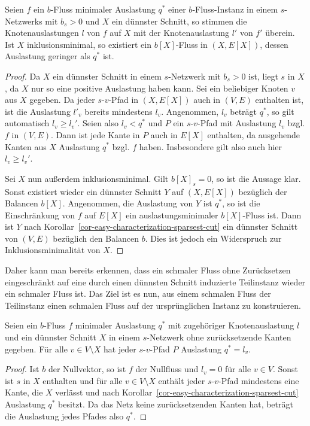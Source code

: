\begin{proposition}\label{prop-restricted-minimal-flow-is-b-flow-on-induced-instance}
	Seien $f$ ein $b$-Fluss minimaler Auslastung $q^*$ einer $b$-Fluss-Instanz in einem $s$-Netzwerks mit $b_s > 0$ und $X$ ein dünnster Schnitt, so stimmen die Knotenauslastungen $l$ von $f$ auf $X$ mit der Knotenauslastung $l'$ von $f'$ überein.
	Ist $X$ inklusionsminimal, so existiert ein $b[X]$-Fluss in $(X, E[X])$, dessen Auslastung geringer als $q^*$ ist.
\end{proposition}
\begin{proof}
	Da $X$ ein dünnster Schnitt in einem $s$-Netzwerk mit $b_s > 0$ ist, liegt $s$ in $X$, da $X$ nur so eine positive Auslastung haben kann.
	Sei ein beliebiger Knoten $v$ aus $X$ gegeben.
	Da jeder $s$-$v$-Pfad in $(X, E[X])$ auch in $(V, E)$ enthalten ist, ist die Auslastung $l'_v$ bereits mindestens $l_v$.
	Angenommen, $l_v$ beträgt $q^*$, so gilt automatisch $l_v \geq l_v'$.
	Seien also $l_v < q^*$ und $P$ ein $s$-$v$-Pfad mit Auslastung $l_v$ bzgl. $f$ in $(V, E)$.
	Dann ist jede Kante in $P$ auch in $E[X]$ enthalten, da ausgehende Kanten aus $X$ Auslastung $q^*$ bzgl. $f$ haben.
	Insbesondere gilt also auch hier $l_v \geq l_v'$.
	
	Sei $X$ nun außerdem inklusionsminimal.
	Gilt $b[X]_s = 0$, so ist die Aussage klar.
	Sonst existiert wieder ein dünnster Schnitt $Y$ auf $(X, E[X])$ bezüglich der Balancen $b[X]$.
	Angenommen, die Auslastung von $Y$ ist $q^*$, so ist die Einschränkung von $f$ auf $E[X]$ ein auslastungsminimaler $b[X]$-Fluss ist.
	Dann ist $Y$ nach Korollar~\ref{cor-easy-characterization-sparsest-cut} ein dünnster Schnitt von $(V, E)$ bezüglich den Balancen $b$.
	Dies ist jedoch ein Widerspruch zur Inklusionsminimalität von $X$.
\end{proof}

Daher kann man bereits erkennen, dass ein schmaler Fluss ohne Zurücksetzen eingeschränkt auf eine durch einen dünnsten Schnitt induzierte Teilinstanz wieder ein schmaler Fluss ist.
Das Ziel ist es nun, aus einem schmalen Fluss der Teilinstanz einen schmalen Fluss auf der ursprünglichen Instanz zu konstruieren.

\begin{lemma}\label{lemma-flow-minimal-congestion-sparsest-cut-then-outside-X-congestion-q}
	Seien ein $b$-Fluss $f$ minimaler Auslastung $q^*$ mit zugehöriger Knotenauslastung $l$ und ein dünnster Schnitt $X$ in einem $s$-Netzwerk ohne zurücksetzende Kanten gegeben.
	Für alle $v\in V\setminus X$ hat jeder $s$-$v$-Pfad $P$ Auslastung $q^*=l_v$.
\end{lemma}
\begin{proof}
	Ist $b$ der Nullvektor, so ist $f$ der Nullfluss und $l_v = 0$ für alle $v\in V$.
	Sonst ist $s$ in $X$ enthalten und für alle $v\in V\setminus X$ enthält jeder $s$-$v$-Pfad mindestens eine Kante, die $X$ verlässt und nach Korollar~\ref{cor-easy-characterization-sparsest-cut} Auslastung $q^*$ besitzt.
	Da das Netz keine zurücksetzenden Kanten hat, beträgt die Auslastung jedes Pfades also $q^*$.
\end{proof}

